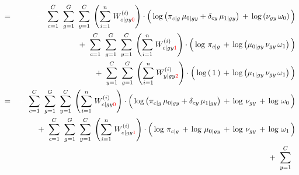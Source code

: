 \begin{enumerate}
\begin{eqnarray*}
&=&
	{\color{white}+} \;\;
	\overset{C}{\underset{c=1}{\sum}}\;\;
	\overset{G}{\underset{g=1}{\sum}}\;\;
	\overset{C}{\underset{y=1}{\sum}}\;
	\left(\overset{n}{\underset{i=1}{\sum}}\;W^{(i)}_{c \vert gy{\color{red}0}}\right)
	\cdot
	\left(\,
		\log\left(\pi_{c \vert g}\,\mu_{0 \vert gy} + \delta_{cy}\,\mu_{1\vert gy}\right)
		\,\overset{{\color{white}.}}{+}\,
		\log\left(\nu_{gy}\,\omega_{0}\right)
	\,\right)
\\
&&
	+ \;\;
	\overset{C}{\underset{c=1}{\sum}}\;\;
	\overset{G}{\underset{g=1}{\sum}}\;\;
	\overset{C}{\underset{y=1}{\sum}}\;
	\left(\overset{n}{\underset{i=1}{\sum}}\;W^{(i)}_{c \vert gy{\color{red}1}}\right)
	\cdot
	\left(\,
		\log\,\pi_{c \vert g}
		\,\overset{{\color{white}.}}{+}\,
		\log\left(\mu_{0\vert gy}\,\nu_{gy}\,\omega_{1}\right)
	\,\right)
\\
&&
	+ \;\;
	\overset{C}{\underset{y=1}{\sum}}\;\;
	\overset{G}{\underset{g=1}{\sum}}\;
	\left(\overset{n}{\underset{i=1}{\sum}}\;W^{(i)}_{y \vert gy{\color{red}2}}\right)
	\cdot
	\left(\,
		\log\left(\,1\,\right)
		\,\overset{{\color{white}.}}{+}\,
		\log\left(\mu_{1 \vert gy}\,\nu_{gy}\,\omega_{1}\right)
	\,\right)
\\
&=&
	{\color{white}+} \;\;
	\overset{C}{\underset{c=1}{\sum}}\;\;
	\overset{G}{\underset{g=1}{\sum}}\;\;
	\overset{C}{\underset{y=1}{\sum}}\;
	\left(\overset{n}{\underset{i=1}{\sum}}\;W^{(i)}_{c \vert gy{\color{red}0}}\right)
	\cdot
	\left(\,
		\log\left(\pi_{c \vert g}\,\mu_{0 \vert gy} + \delta_{cy}\,\mu_{1\vert gy}\right)
		\,\overset{{\color{white}.}}{+}\,
		\log\,\nu_{gy}
		\,\overset{{\color{white}.}}{+}\,
		\log\,\omega_{0}
	\,\right)
\\
&&
	+ \;\;
	\overset{C}{\underset{c=1}{\sum}}\;\;
	\overset{G}{\underset{g=1}{\sum}}\;\;
	\overset{C}{\underset{y=1}{\sum}}\;
	\left(\overset{n}{\underset{i=1}{\sum}}\;W^{(i)}_{c \vert gy{\color{red}1}}\right)
	\cdot
	\left(\,
		\log\,\pi_{c \vert g}
		\,\overset{{\color{white}.}}{+}\,
		\log\,\mu_{0\vert gy}
		\,\overset{{\color{white}.}}{+}\,
		\log\,\nu_{gy}
		\,\overset{{\color{white}.}}{+}\,
		\log\,\omega_{1}
	\,\right)
\\
&&
	+ \;\;
	\overset{C}{\underset{y=1}{\sum}}\;\;

\end{eqnarray*}
\end{enumerate}
